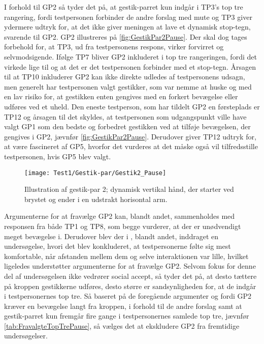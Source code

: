 \noindent
% 
I forhold til GP2 så tyder det på, at gestik-parret kun indgår i TP3's top tre rangering, fordi testpersonen forbinder de andre forslag med mute og TP3 giver ydermere udtryk for, at det ikke giver meningen at lave et dynamisk stop-tegn, svarende til GP2. GP2 illustreres på \autoref{fig:GestikPar2Pause}. Der skal dog tages forbehold for, at TP3, ud fra testpersonens respons, virker forvirret og selvmodsigende. Ifølge TP7 bliver GP2 inkluderet i top tre rangeringen, fordi det virkede lige til og at det er det testpersonen forbinder med et stop-tegn. Årsagen til at TP10 inkluderer GP2 kan ikke direkte udledes af testpersonens udsagn, men generelt har testpersonen valgt gestikker, som var nemme at huske og med en lav risiko for, at gestikken enten gengives med en forkert bevægelse eller udføres ved et uheld. Den eneste testperson, som har tildelt GP2 en førsteplads er TP12 og årsagen til det skyldes, at testpersonen som udgangspunkt ville have valgt GP1 som den bedste og forbedret gestikken ved at tilføje bevægelsen, der gengives i GP2, jævnfør \autoref{fig:GestikPar2Pause}. Derudover giver TP12 udtryk for, at være fascineret af GP5, hvorfor det vurderes at det måske også vil tilfredsstille testpersonen, hvis GP5 blev valgt. 
%
\begin{figure}[H]
	\centering
	\texttt{[image: Test1/Gestik-par/Gestik2\_Pause]}
	\caption{Illustration af gestik-par 2; dynamisk vertikal hånd, der starter ved brystet og ender i en udstrakt horisontal arm.}
	\label{fig:GestikPar2Pause}
\end{figure}
\noindent
% 
Argumenterne for at fravælge GP2 kan, blandt andet, sammenholdes med responsen fra både TP1 og TP8, som begge vurderer, at der er unødvendigt meget bevægelse i. Derudover blev der i , blandt andet, inddraget en undersøgelse, hvori det blev konkluderet, at testpersonerne følte sig mest komfortable, når afstanden mellem dem og selve interaktionen var lille, hvilket ligeledes understøtter argumenterne for at fravælge GP2. Selvom fokus for denne del af undersøgelsen ikke vedrører social accept, så tyder det på, at desto tættere på kroppen gestikkerne udføres, desto større er sandsynligheden for, at de indgår i testpersonernes top tre. Så baseret på de foregående argumenter og fordi GP2 kræver en bevægelse langt fra kroppen, i forhold til de andre forslag samt at gestik-parret kun fremgår fire gange i testpersonernes samlede top tre, jævnfør \autoref{tab:FravalgteTopTrePause}, så vælges det at ekskludere GP2 fra fremtidige undersøgelser. 
%
